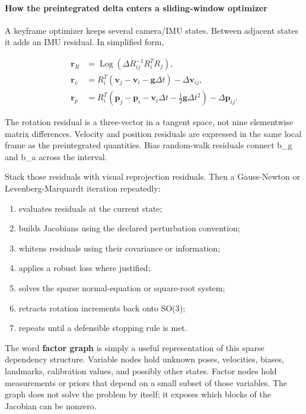 \paragraph{How the preintegrated delta enters a sliding-window optimizer}\label{04-visual-computing-ii-ch035-how-the-preintegrated-delta-enters-a-sliding-window-optimizer}

A keyframe optimizer keeps several camera/IMU states. Between adjacent states it adds an IMU residual. In simplified form,

\[
\begin{aligned}
\mathbf r_R &= \operatorname{Log}(\Delta R_{ij}^{-1}R_i^TR_j),\\
\mathbf r_v &= R_i^T(\mathbf v_j-\mathbf v_i-\mathbf g\Delta t)-\Delta\mathbf v_{ij},\\
\mathbf r_p &= R_i^T(\mathbf p_j-\mathbf p_i-\mathbf v_i\Delta t-\tfrac12\mathbf g\Delta t^2)-\Delta\mathbf p_{ij}.
\end{aligned}
\]

The rotation residual is a three-vector in a tangent space, not nine elementwise matrix differences. Velocity and position residuals are expressed in the same local frame as the preintegrated quantities. Bias random-walk residuals connect b\_g and b\_a across the interval.

Stack those residuals with visual reprojection residuals. Then a Gauss-Newton or Levenberg-Marquardt iteration repeatedly:

\begin{enumerate}
\def\labelenumi{\arabic{enumi}.}
\tightlist
\item
  evaluates residuals at the current state;
\item
  builds Jacobians using the declared perturbation convention;
\item
  whitens residuals using their covariance or information;
\item
  applies a robust loss where justified;
\item
  solves the sparse normal-equation or square-root system;
\item
  retracts rotation increments back onto SO(3);
\item
  repeats until a defensible stopping rule is met.
\end{enumerate}

The word \textbf{factor graph} is simply a useful representation of this sparse dependency structure. Variable nodes hold unknown poses, velocities, biases, landmarks, calibration values, and possibly other states. Factor nodes hold measurements or priors that depend on a small subset of those variables. The graph does not solve the problem by itself; it exposes which blocks of the Jacobian can be nonzero.

